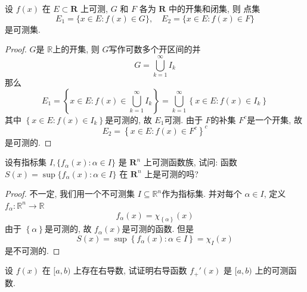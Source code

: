 \documentclass[../main.tex]{subfiles}
\begin{document}
\begin{exercise}{}{}
    设 $f(x)$ 在 $E \subset \mathbf{R}$ 上可测, $G$ 和 $F$ 各为 $\mathbf{R}$ 中的开集和闭集, 则
点集
\[
E_1 = \{x \in E: f(x) \in G\}, \quad E_2 = \{x \in E: f(x) \in F\}
\]
是可测集.
\end{exercise}

\begin{proof}
    \(  G  \)是 \(  \mathbb{R}   \)上的开集, 则 \(  G  \)写作可数多个开区间的并 \[
    G= \bigcup _{k = 1}^{\infty}I_{k}
    \]那么 \[
    E_1= \left\{ x\in E: f\left( x \right)\in \bigcup _{k = 1}^{\infty}I_{k}  \right\}= \bigcup _{k = 1}^{\infty}\left\{ x \in E:f\left( x \right)\in I_{k}  \right\}
    \]   其中 \(  \left\{ x\in E: f\left( x \right)\in I_{k}  \right\}  \)是可测的, 故 \(  E_1  \)可测. 由于 \(  F  \)的补集 \(  F^{c}  \)是一个开集, 故 \[
    E_2= \left\{ x\in E: f\left( x \right)\in F^{c}  \right\}^{c}
    \]    是可测的.
\end{proof}
\begin{exercise}{}{}
    设有指标集 $I, \{f_\alpha(x): \alpha \in I\}$ 是 $\mathbf{R}^n$ 上可测函数族, 试问: 函数 $S(x)=\sup\{f_\alpha(x): \alpha \in I\}$ 在 $\mathbf{R}^n$ 上是可测的吗?
\end{exercise}
\begin{proof}
    不一定, 我们用一个不可测集 \(  I\subseteq \mathbb{R} ^{n}  \)作为指标集. 并对每个 \(  \alpha \in I  \), 定义 \(  f_{\alpha }:  \mathbb{R} ^{n}\to \mathbb{R} \)  \[
    f_{\alpha }\left( x \right)= \chi _{\left\{ \alpha  \right\}}\left( x \right)  
    \]由于 \(  \left\{ \alpha  \right\}  \)是可测的, 故 \(  f_{\alpha }\left( x \right)   \)是可测的函数. 但是 \[
 S\left( x \right)    = \sup \left\{ f_{\alpha }\left( x \right):\alpha \in I  \right\}=  \chi _{I}\left( x \right) 
    \]    是不可测的.
\end{proof}
\begin{exercise}{}{}
    设 $f(x)$ 在 $[a,b)$ 上存在右导数, 试证明右导函数 $f_+'(x)$ 是 $[a,b)$ 上的可测函数.
\end{exercise}
\end{document}
